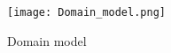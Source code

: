 \begin{figure}[hbt]
	\centering
	\texttt{[image: Domain\_model.png]}
	\caption{Domain model}
	\label{fig:domain-model}
\end{figure}
	